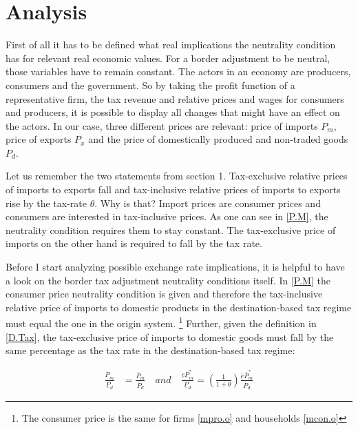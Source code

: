 \section{Analysis} \label{analysis}
First of all it has to be defined what real implications the neutrality condition has for relevant real economic values. For a border adjustment to be neutral, those variables have to remain constant. The actors in an economy are producers, consumers and the government. So by taking the profit function of a representative firm, the tax revenue and relative prices and wages for consumers and producers, it is possible to display all changes that might have an effect on the actors. In our case, three different prices are relevant: price of imports $P_m$, price of exports $P_x$ and the price of domestically produced and non-traded goods $P_d$. 

Let us remember the two statements from section 1. Tax-exclusive relative prices of imports to exports fall and tax-inclusive relative prices of imports to exports rise by the tax-rate $\theta$. Why is that? Import prices are consumer prices and consumers are interested in tax-inclusive prices. As one can see in \eqref{P.M}, the neutrality condition requires them to stay constant. The tax-exclusive price of imports on the other hand is required to fall by the tax rate. 

Before I start analyzing possible exchange rate implications, it is helpful to have a look on the border tax adjustment neutrality conditions itself. 
In \eqref{P.M} the consumer price neutrality condition is given and therefore the tax-inclusive relative price of imports to domestic products in the destination-based tax regime must equal the one in the origin system. \footnote{The consumer price is the same for firms \eqref{mpro.o} and households \eqref{mcon.o}} Further, given the definition in \eqref{D.Tax}, the tax-exclusive price of imports to domestic goods must fall by the same percentage as the tax rate in the destination-based tax regime: 

\begin{equation}\label{mtod}
\begin{aligned}
\frac{\underline P_m}{\underline P_d} &= \frac{\overline P_m}{\overline P_d} \quad and \quad \frac{\underline e \underline P_m^*}{\underline P_d} =  \left( \frac{1}{1+\theta} \right) \frac{\overline e \overline P^*_m}{\overline P_d}
\end{aligned}
\end{equation}

